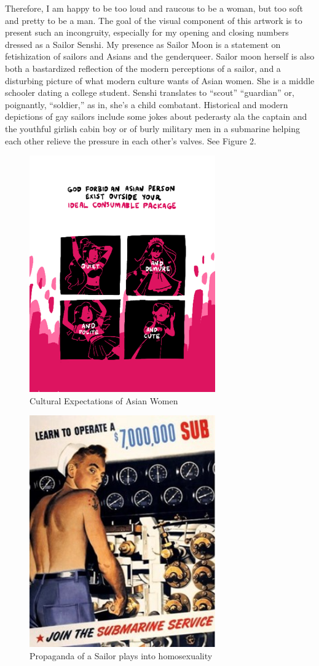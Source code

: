 \documentclass{article}[12pt,letterpaper]
\begin{document}
Therefore, I am happy to be too loud and raucous to be a woman, but too soft and pretty to be a man. The goal of the visual component of this artwork is to present such an incongruity, especially for my opening and closing numbers dressed as a Sailor Senshi. My presence as Sailor Moon is a statement on fetishization of sailors and Asians and the genderqueer. Sailor moon herself is also both a bastardized reflection of the modern perceptions of a sailor, and a disturbing picture of what modern culture wants of Asian women. She is a middle schooler dating a college student. Senshi translates to “scout” “guardian” or, poignantly, “soldier,” as in, she’s a child combatant. Historical and modern depictions of gay sailors include some jokes about pederasty ala the captain and the youthful girlish cabin boy or of burly military men in a submarine helping each other relieve the pressure in each other’s valves. See Figure 2.\\
\begin{figure}
    \centering
    \includegraphics[width=8cm]{Picture1.png}
    \caption{Cultural Expectations of Asian Women}
    \label{fig:1}
\end{figure}
\begin{figure}
    \centering
    \includegraphics[width=8cm]{Picture2.jpg}
    \caption{Propaganda of a Sailor plays into homosexuality}
    \label{fig:enter-label}
\end{figure}
\end{document}
